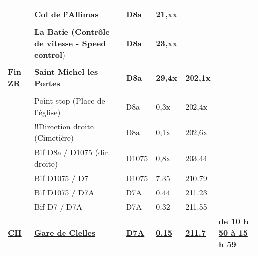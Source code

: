 \documentclass{article}%
\begin{document}
\begin{longtable}{p{2.25cm}|p{6.7cm}|p{2.0cm}|p{1.5cm}|p{1.5cm}|p{3.5cm}}
 & & & & & \\%
 &\textbf{Col de l'Allimas  }&\textbf{D8a}&\textbf{21,xx}& & \\%
 & & & & & \\%
 &\textbf{La Batie (Contrôle de vitesse - Speed control)}&\textbf{D8a}&\textbf{23,xx}& & \\%
 & & & & & \\%
\textbf{Fin ZR}&\textbf{Saint Michel les Portes}&\textbf{D8a}&\textbf{29,4x}&\textbf{202,1x}& \\%
 & & & & & \\%
 &Point stop (Place de l'église)&D8a&0,3x&202,4x& \\%
 &!!Direction droite (Cimetière) &D8a&0,1x&202,6x& \\%
 &Bif D8a / D1075 (dir. droite)&D1075&0,8x&203.44& \\%
 &Bif D1075 / D7 &D1075&7.35&210.79& \\%
 &Bif D1075 / D7A&D7A&0.44&211.23& \\%
 &Bif D7 / D7A&D7A&0.32&211.55& \\%
\textbf{\underline{CH}}&\textbf{\underline{Gare de  Clelles}}&\textbf{\underline{D7A}}&\textbf{\underline{0.15}}&\textbf{\underline{211.7}}&\textbf{\underline{de 10 h 50 à 15 h 59}}\\%
\hline%
\end{longtable}%
\end{document}
